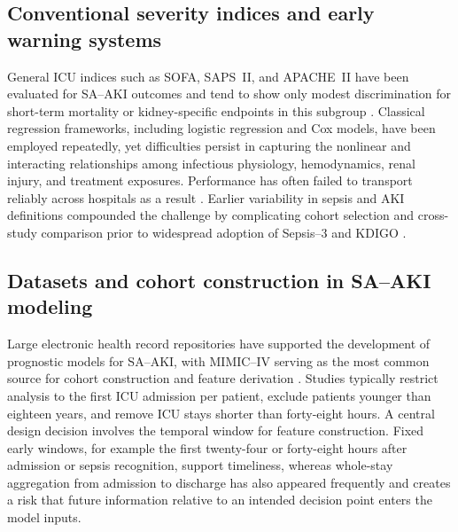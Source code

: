 \subsection{Conventional severity indices and early warning systems}
General ICU indices such as SOFA, SAPS~II, and APACHE~II have been evaluated for SA--AKI outcomes and tend to show only modest discrimination for short-term mortality or kidney-specific endpoints in this subgroup \citep{Luo_2022,Li_2023_SciRep,Qu_2024}. Classical regression frameworks, including logistic regression and Cox models, have been employed repeatedly, yet difficulties persist in capturing the nonlinear and interacting relationships among infectious physiology, hemodynamics, renal injury, and treatment exposures. Performance has often failed to transport reliably across hospitals as a result \citep{Kang_Yoon_2023,Luo_2022,Li_2023_SciRep}. Earlier variability in sepsis and AKI definitions compounded the challenge by complicating cohort selection and cross-study comparison prior to widespread adoption of Sepsis--3 and KDIGO \citep{Singer_2016,KDIGO_2012}.

\subsection{Datasets and cohort construction in SA--AKI modeling}
Large electronic health record repositories have supported the development of prognostic models for SA--AKI, with MIMIC--IV serving as the most common source for cohort construction and feature derivation \citep{Johnson_2023_MIMIC}. Studies typically restrict analysis to the first ICU admission per patient, exclude patients younger than eighteen years, and remove ICU stays shorter than forty-eight hours. A central design decision involves the temporal window for feature construction. Fixed early windows, for example the first twenty-four or forty-eight hours after admission or sepsis recognition, support timeliness, whereas whole-stay aggregation from admission to discharge has also appeared frequently and creates a risk that future information relative to an intended decision point enters the model inputs.

